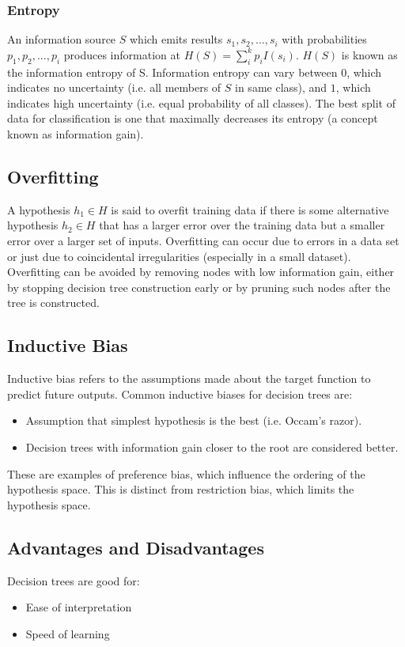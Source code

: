 \documentclass[12pt,titlepage]{article}
\begin{document}
      \subsubsection{Entropy}
        An information source $S$ which emits results $s_1, s_2, ..., s_i$ with probabilities $p_1, p_2, ..., p_i$ produces information at
        $H(S) = \sum_i^k p_i I(s_i)$. $H(S)$ is known as the information entropy of S. Information entropy can vary between $0$, which indicates no uncertainty
        (i.e. all members of $S$ in same class), and $1$, which indicates high uncertainty (i.e. equal probability of all classes). The best split of data for
        classification is one that maximally decreases its entropy (a concept known as information gain).

    \subsection{Overfitting}
      A hypothesis $h_1 \in H$ is said to overfit training data if there is some alternative hypothesis $h_2 \in H$ that has a larger error over the training
      data but a smaller error over a larger set of inputs. Overfitting can occur due to errors in a data set or just due to coincidental irregularities
      (especially in a small dataset). Overfitting can be avoided by removing nodes with low information gain, either by stopping decision tree construction early
      or by pruning such nodes after the tree is constructed.

    \subsection{Inductive Bias}
      Inductive bias refers to the assumptions made about the target function to predict future outputs. Common inductive biases for decision trees are:
      \begin{itemize}
        \item Assumption that simplest hypothesis is the best (i.e. Occam's razor).
        \item Decision trees with information gain closer to the root are considered better.
      \end{itemize}

      These are examples of preference bias, which influence the ordering of the hypothesis space. This is distinct from restriction bias, which limits the hypothesis
      space.

    \subsection{Advantages and Disadvantages}
      Decision trees are good for:
      \begin{itemize}
        \item Ease of interpretation
        \item Speed of learning
      \end{itemize}
\end{document}
